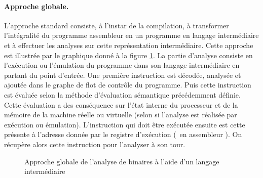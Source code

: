 \paragraph{Approche globale.}
L'approche standard  consiste, à l'instar de la compilation, à transformer l'intégralité du programme assembleur en un programme en langage intermédiaire et à effectuer les analyses sur cette représentation intermédiaire.
Cette approche est illustrée par le graphique donné à la figure \ref{fig:diag_approche_globale}. La partie d'analyse consiste en l'exécution ou l'émulation du programme dans son langage intermédiaire en partant du point d'entrée.
Une première instruction est décodée, analysée et ajoutée dans le graphe de flot de contrôle du programme. Puis cette instruction est évaluée selon la méthode d'évaluation sémantique précédemment définie.
Cette évaluation a des conséquence sur l'état interne du processeur et de la mémoire de la machine réelle ou virtuelle (selon si l'analyse est réalisée par exécution ou émulation).
L'instruction qui doit être exécutée ensuite est cette présente à l'adresse donnée par le registre d'exécution (\eip\ en assembleur \xq). On récupère alors cette instruction pour l'analyser à son tour.

\begin{figure}
\begin{center}
\end{center}
\caption{Approche globale de l'analyse de binaires à l'aide d'un langage intermédiaire}
\label{fig:diag_approche_globale}
\end{figure}


